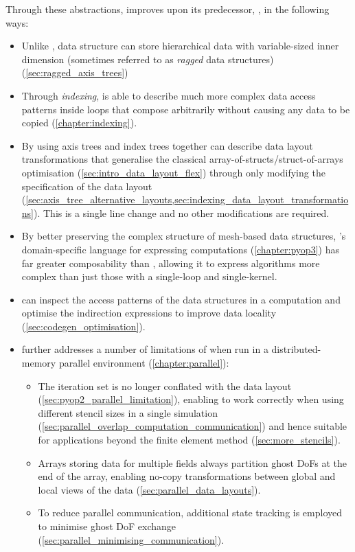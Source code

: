 \documentclass[thesis]{subfiles}
\begin{document}
Through these abstractions,  improves upon its predecessor, , in the following ways:
\begin{itemize}
  \item
    Unlike ,  data structure can store hierarchical data with variable-sized inner dimension (sometimes referred to as \emph{ragged} data structures) (\cref{sec:ragged_axis_trees})
  \item
    Through \emph{indexing},  is able to describe much more complex data access patterns inside loops that compose arbitrarily without causing any data to be copied (\cref{chapter:indexing}).
  \item
    By using axis trees and index trees together  can describe data layout transformations that generalise the classical array-of-structs/struct-of-arrays optimisation (\cref{sec:intro_data_layout_flex}) through only modifying the specification of the data layout (\cref{sec:axis_tree_alternative_layouts,sec:indexing_data_layout_transformations}).
    This is a single line change and no other modifications are required.
  \item
    By better preserving the complex structure of mesh-based data structures, 's domain-specific language for expressing computations (\cref{chapter:pyop3}) has far greater composability than , allowing it to express algorithms more complex than just those with a single-loop and single-kernel.
  \item
     can inspect the access patterns of the data structures in a computation and optimise the indirection expressions to improve data locality (\cref{sec:codegen_optimisation}).
  \item {} further addresses a number of limitations of  when run in a distributed-memory parallel environment (\cref{chapter:parallel}):
    \begin{itemize}
      \item
        The iteration set is no longer conflated with the data layout (\cref{sec:pyop2_parallel_limitation}), enabling  to work correctly when using different stencil sizes in a single simulation (\cref{sec:parallel_overlap_computation_communication}) and hence suitable for applications beyond the finite element method (\cref{sec:more_stencils}).
      \item
        Arrays storing data for multiple fields always partition ghost DoFs at the end of the array, enabling no-copy transformations between global and local views of the data (\cref{sec:parallel_data_layouts}).
      \item
        To reduce parallel communication, additional state tracking is employed to minimise ghost DoF exchange (\cref{sec:parallel_minimising_communication}).
    \end{itemize}
\end{itemize}
\end{document}
